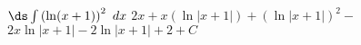 {$\ds \int \left(\ln (x+1)\right)^2\ dx$}
{$2 x+x \left(\ln |x+1|\right)+\left(\ln |x+1|\right)^2-$ $2 x \ln |x+1|-2 \ln |x+1|+2+C$
}

